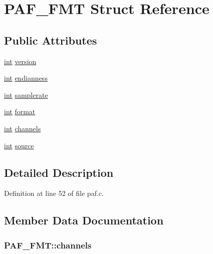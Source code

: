 \hypertarget{struct_p_a_f___f_m_t}{}\section{P\+A\+F\+\_\+\+F\+MT Struct Reference}
\label{struct_p_a_f___f_m_t}
\subsection*{Public Attributes}
\begin{DoxyCompactItemize}
\item 
\hyperlink{xmltok_8h_a5a0d4a5641ce434f1d23533f2b2e6653}{int} \hyperlink{struct_p_a_f___f_m_t_ab7e777e63b547008e49564b40da2fc45}{version}
\item 
\hyperlink{xmltok_8h_a5a0d4a5641ce434f1d23533f2b2e6653}{int} \hyperlink{struct_p_a_f___f_m_t_a0a0251d499c1a6c0e6954dc4324725b1}{endianness}
\item 
\hyperlink{xmltok_8h_a5a0d4a5641ce434f1d23533f2b2e6653}{int} \hyperlink{struct_p_a_f___f_m_t_aa063cf73c94e0d7cf3a37ab037a6fd73}{samplerate}
\item 
\hyperlink{xmltok_8h_a5a0d4a5641ce434f1d23533f2b2e6653}{int} \hyperlink{struct_p_a_f___f_m_t_a18f56aa5e22d7a093b72b6c514925e84}{format}
\item 
\hyperlink{xmltok_8h_a5a0d4a5641ce434f1d23533f2b2e6653}{int} \hyperlink{struct_p_a_f___f_m_t_ad43a1ba522ebffc76544c14053f5bc42}{channels}
\item 
\hyperlink{xmltok_8h_a5a0d4a5641ce434f1d23533f2b2e6653}{int} \hyperlink{struct_p_a_f___f_m_t_a51c30577099d9b63b6b6b313c35b0151}{source}
\end{DoxyCompactItemize}


\subsection{Detailed Description}


Definition at line 52 of file paf.\+c.



\subsection{Member Data Documentation}
\subsubsection[{\texorpdfstring{channels}{channels}}]{ P\+A\+F\+\_\+\+F\+M\+T\+::channels}\hypertarget{struct_p_a_f___f_m_t_ad43a1ba522ebffc76544c14053f5bc42}{}\label{struct_p_a_f___f_m_t_ad43a1ba522ebffc76544c14053f5bc42}


